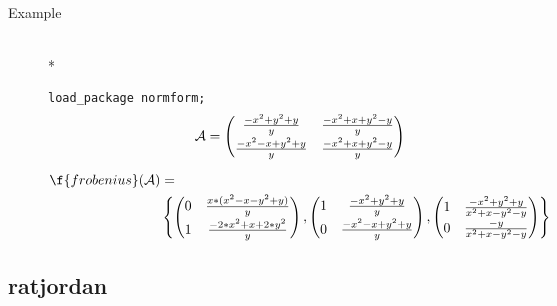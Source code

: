 \begin{description}
\item[Example]\mbox{}\\*

\texttt{load\_package normform;}
\begin{gather*}
\mathcal{A} = \begin{pmatrix} \frac{-x^2+y^2+y}{y} & 
\frac{-x^2+x+y^2-y}{y} \\[1mm] \frac{-x^2-x+y^2+y}{y} & \frac{-x^2+x+y^2-y}
{y} \end{pmatrix} \\[2mm]
\begin{split}
\f{frobenius}(\mathcal{A}) &=  \\
&\left\{
   \begin{pmatrix} 0 & \frac{x*(x^2-x-y^2+y)}{y} \\[1mm]
                   1 & \frac{-2*x^2+x+2*y^2}{y} \end{pmatrix},
   \begin{pmatrix}
     1 & \frac{-x^2+y^2+y}{y} \\[1mm] 0 & \frac{-x^2-x+y^2+y}{y}
   \end{pmatrix},
   \begin{pmatrix} 1 & \frac{-x^2+y^2+y}{x^2+x-y^2-y} \\[1mm]
      0 & \frac{-y}{x^2+x-y^2-y} \end{pmatrix}
 \right\}
\end{split}
\end{gather*}
\end{description}

\subsection{ratjordan}

